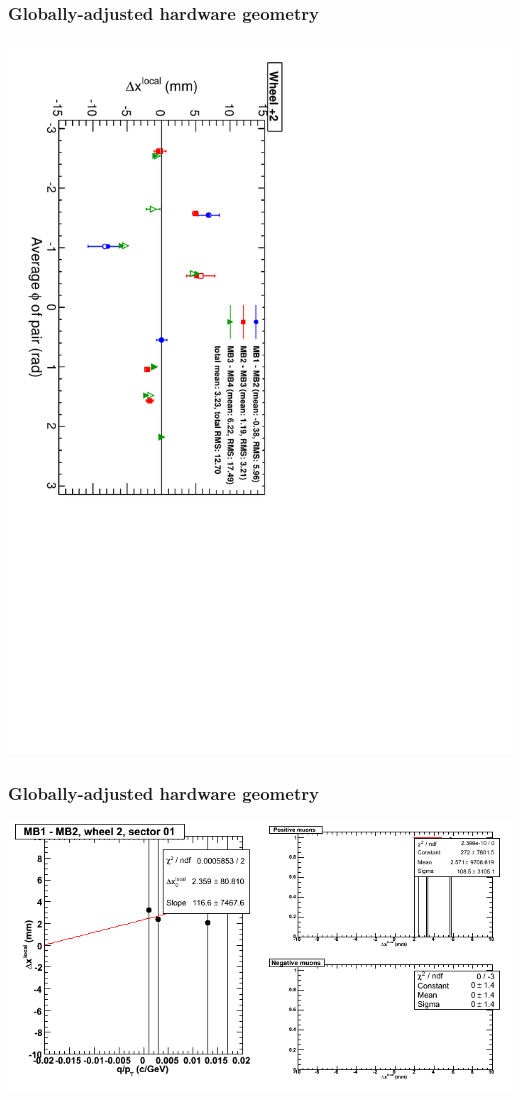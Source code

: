 \documentclass[compress]{beamer}
\begin{document}
\begin{frame}
\frametitle{Globally-adjusted hardware geometry}
\includegraphics[height=\linewidth, angle=90]{NOV4_segdiff_HW_x_whp2.pdf}
\end{frame}

\begin{frame}
\frametitle{Globally-adjusted hardware geometry}
\includegraphics[width=\linewidth]{NOV4_segdiffs_HW/dt13_resid_E_01_12.png}
\end{frame}
\end{document}
